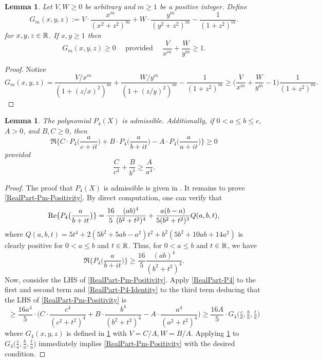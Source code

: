 \documentclass[12pt,psamsfonts]{amsart}
\newtheorem{lem}[thm]{Lemma}
\theoremstyle{definition}
\theoremstyle{remark}
\numberwithin{equation}{section}
\begin{document}
\begin{lem} \label{GmLemma}
Let $V,W \geq 0$ be arbitrary and $m \geq 1$ be a positive integer. Define
\[
G_m(x,y,z) := V \cdot \frac{x^m}{(x^2+z^2)^m} + W \cdot \frac{y^m}{(y^2+z^2)^m} - \frac{1}{(1+z^2)^m}.
\]
for $x,y,z \in \R$. If $x,y \geq 1$ then
\[
G_m(x,y,z) \geq 0 \quad \text{ provided } \quad \frac{V}{x^m} + \frac{W}{y^m} \geq 1.
\]
\end{lem}
\begin{proof} Notice
\[
G_m(x,y,z) = \frac{V/x^m}{(1+(z/x)^2)^m} + \frac{W/y^m}{(1+(z/y)^2)^m} - \frac{1}{(1+z^2)^m} \geq \Big( \frac{V}{x^m} + \frac{W}{y^m} - 1\Big) \frac{1}{(1+z^2)^m}. 
\]
\end{proof}
\begin{lem}
\label{PmLemma}
The polynomial $P_4(X)$ is admissible. Additionally, if $0 < a \leq b \leq c$, $A > 0$, and $B,C \geq 0$, then
\begin{equation}
\Re\{ C \cdot P_4\big( \frac{a}{c+it} \big) + B \cdot P_4\big( \frac{a}{b+it} \big) -  A \cdot P_4\big( \frac{a}{a+it} \big)  \} \geq 0
\label{RealPart-Pm-Positivity}
\end{equation}
provided 
\[
 \frac{C}{c^4} + \frac{B}{b^4} \geq  \frac{A}{a^4}. 
\]
\end{lem}
\begin{proof} The proof that  $P_4(X)$ is admissible is given in \cite[Section 4]{HBLinnik}. It remains to prove \eqref{RealPart-Pm-Positivity}. By direct computation, one can verify that
\begin{equation}
\Re\{P_4\big( {a\over b+it}\big)\}
={16\over 5}{(ab)^4\over (b^2+t^2)^4}
+{a(b-a)\over 5(b^2+t^2)^3}Q(a,b,t),
\label{RealPart-P4-Identity}
\end{equation}
where $Q(a,b,t)
=5t^4+2(5b^2+5ab-a^2)t^2+b^2(5b^2+10ab+14a^2)$ is clearly positive for $0<a\leq b$ and $t \in \R$. Thus, for $0 <  a \leq b$ and $t \in \R$, we have
\begin{equation}
\Re\{ P_4\big( \frac{a}{b+it} \big) \} \geq \frac{16}{5} \frac{ (a b)^4}{(b^2+t^2)^4}.
\label{RealPart-P4}
\end{equation}
Now, consider the LHS of \eqref{RealPart-Pm-Positivity}. Apply \eqref{RealPart-P4} to the first and second term and \eqref{RealPart-P4-Identity}  to the third term deducing that the LHS of \eqref{RealPart-Pm-Positivity} is
\begin{equation}
 \geq  \frac{16a^4}{5} \cdot \Big( C \cdot \frac{ c^4}{(c^2+t^2)^4} + B \cdot \frac{ b^4}{(b^2+t^2)^4} -  A \cdot \frac{ a^4}{(a^2+t^2)^4} \Big) \geq \frac{16A}{5} \cdot G_4\big(\tfrac{c}{a}, \tfrac{b}{a}, \tfrac{t}{a}\big) 
 \label{RealPart-P4-Reduction}
\end{equation}
where $G_4(x,y,z)$ is defined in \cref{GmLemma} with $V = C/A, W = B/A$. Applying \cref{GmLemma} to $G_4\big(\tfrac{c}{a}, \tfrac{b}{a}, \tfrac{t}{a}\big)$ immediately implies \eqref{RealPart-Pm-Positivity} with the desired condition.
\end{proof}
\end{document}
